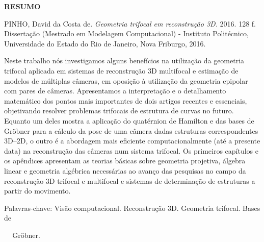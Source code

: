 \begin{center}
{\bf RESUMO}
\end{center}

\vspace{1.5 cm}

\begin{center}
\begin{minipage}{1\textwidth}
\noindent PINHO, David da Costa de. {\it Geometria trifocal em reconstrução 3D.} 2016. 128 f. Dissertação (Mestrado em Modelagem Computacional) - Instituto Politécnico, Universidade do Estado do Rio de Janeiro, Nova Friburgo, 2016.
\end{minipage}
\end{center}

\begin{center}
\begin{minipage}{1\textwidth}
\qquad Neste trabalho nós investigamos alguns benefícios na utilização da geometria trifocal aplicada em sistemas de reconstrução 3D multifocal e estimação de modelos de múltiplas câmeras, em oposição à utilização da geometria epipolar com pares de câmeras. Apresentamos a interpretação e o detalhamento matemático dos pontos mais importantes de dois artigos recentes e essenciais, objetivando resolver problemas trifocais de estrutura de curvas no futuro. Equanto um deles mostra a aplicação do quatérnion de Hamilton e das bases de Gr\"obner para a cálculo da pose de uma câmera dadas estruturas correspondentes 3D--2D, o outro é a abordagem mais eficiente computacionalmente (até a presente data) na reconstrução das câmeras num sistema trifocal. Os primeiros capítulos e os apêndices apresentam as teorias básicas sobre geometria projetiva, álgebra linear e geometria algébrica necessárias ao avanço das pesquisas no campo da reconstrução 3D trifocal e multifocal e sistemas de determinação de estruturas a partir do movimento.
\end{minipage}
\end{center}
 
\begin{flushleft}
Palavras-chave: Visão computacional. Reconstrução 3D. Geometria trifocal. Bases de 
\end{flushleft}\vspace{-.5 cm}
\qquad \qquad \qquad \,\,\,\,\, Gr\"obner.
\newpage